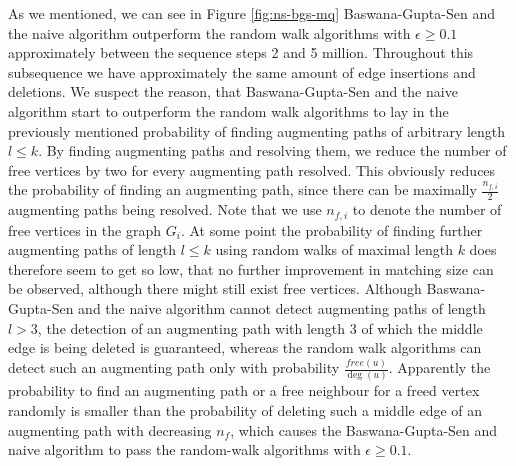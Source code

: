 \documentclass{article}      %
\newcommand\todo[1]{\textcolor{blue}{\textbf{todo: }#1}}
\begin{document}
As we mentioned, we can see in Figure \ref{fig:ns-bgs-mq} Baswana-Gupta-Sen and the naive algorithm outperform the random walk algorithms with $\epsilon \geq 0.1$ approximately between the sequence steps 2 and 5 million. Throughout this subsequence we have approximately the same amount of edge insertions and deletions. We suspect the reason, that Baswana-Gupta-Sen and the naive algorithm start to outperform the random walk algorithms to lay in the previously mentioned probability of finding augmenting paths of arbitrary length $l \leq k$. By finding augmenting paths and resolving them, we reduce the number of free vertices by two for every augmenting path resolved. This obviously reduces the probability of finding an augmenting path, since there can be maximally $\frac{n_{f,i}}{2}$ augmenting paths being resolved. Note that we use $n_{f,i}$ to denote the number of free vertices in the graph $G_i$. At some point the probability of finding further augmenting paths of length $l \leq k$ using random walks of maximal length $k$ does therefore seem to get so low, that no further improvement in matching size can be observed, although there might still exist free vertices. Although Baswana-Gupta-Sen and the naive algorithm cannot detect augmenting paths of length $l > 3$, the detection of an augmenting path with length 3 of which the middle edge is being deleted is guaranteed, whereas the random walk algorithms can detect such an augmenting path only with probability $\frac{free(u)}{\deg(u)}$. Apparently the probability to find an augmenting path or a free neighbour for a freed vertex randomly is smaller than the probability of deleting such a middle edge of an augmenting path with decreasing $n_f$, which causes the Baswana-Gupta-Sen and naive algorithm to pass the random-walk algorithms with $\epsilon \geq 0.1$.


\end{document}
